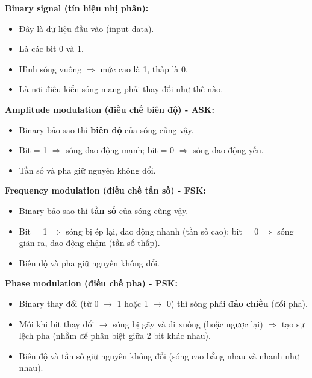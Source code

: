 \noindent
\textbf{Binary signal (tín hiệu nhị phân):}

\begin{itemize}
    \item[$\rightarrow$] Đây là dữ liệu đầu vào (input data).
    \item[$\rightarrow$] Là các bit 0 và 1.
    \item[$\rightarrow$] Hình sóng vuông $\Rightarrow$ mức cao là 1, thấp là 0.
    \item[$\rightarrow$] Là nơi điều kiển sóng mang phải thay đổi như thế nào.
\end{itemize}
\medskip

\noindent
\textbf{Amplitude modulation (điều chế biên độ) - ASK:}

\begin{itemize}
    \item[$\rightarrow$] Binary bảo sao thì \textbf{biên độ} của sóng cũng vậy.
    \item[$\rightarrow$] Bit = 1 $\Rightarrow$ sóng dao động mạnh; bit = 0 $\Rightarrow$ sóng dao động yếu.
    \item[$\rightarrow$] Tần số và pha giữ nguyên không đổi.
\end{itemize}
\medskip

\noindent
\textbf{Frequency modulation (điều chế tần số) - FSK:}

\begin{itemize}
    \item[$\rightarrow$] Binary bảo sao thì \textbf{tần số} của sóng cũng vậy.
    \item[$\rightarrow$] Bit = 1 $\Rightarrow$ sóng bị ép lại, dao động nhanh (tần số cao); bit = 0 $\Rightarrow$ sóng giãn ra, dao động chậm (tần số thấp).
    \item[$\rightarrow$] Biên độ và pha giữ nguyên không đổi.
\end{itemize}
\medskip

\clearpage

\noindent
\textbf{Phase modulation (điều chế pha) - PSK:}

\begin{itemize}
    \item[$\rightarrow$] Binary thay đổi (từ 0 $\rightarrow$ 1 hoặc 1 $\rightarrow$ 0) thì sóng phải \textbf{đảo chiều} (đổi pha).
    \item[$\rightarrow$] Mỗi khi bit thay đổi $\rightarrow$ sóng bị gãy và đi xuống (hoặc ngược lại) $\Rightarrow$ tạo sự lệch pha (nhằm để phân biệt giữa 2 bit khác nhau).
    \item[$\rightarrow$] Biên độ và tần số giữ nguyên không đổi (sóng cao bằng nhau và nhanh như nhau).
\end{itemize}
\medskip

